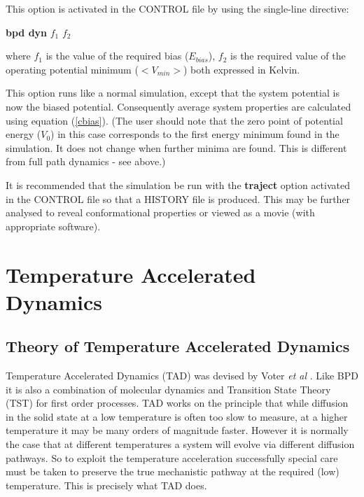 \noindent This option is activated in the CONTROL file by using the 
single-line directive:

{\bf bpd dyn} $f_1$ $f_2$

\noindent where $f_1$ is the value of the required bias ($E_{bias}$), 
$f_2$ is the required value of the operating potential minimum
($<V_{min}>$) both expressed in Kelvin.

This option runs like a normal \D{} simulation, except that the
system potential is now the biased potential. Consequently average
system properties are calculated using equation (\ref{cbias}). (The user
should note that the zero point of potential energy ($V_{0}$) in this case
corresponds to the first energy minimum found in the simulation. It does not
change when further minima are found. This is different from full path
dynamics - see above.)

It is recommended that the simulation be run with the {\bf traject}
option activated in the CONTROL file so that a HISTORY file is
produced. This may be further analysed to reveal conformational
properties or viewed as a movie (with appropriate software).

\section{Temperature Accelerated Dynamics}
\label{TAD}
\subsection{Theory of Temperature Accelerated Dynamics}

Temperature Accelerated Dynamics (TAD) was devised by Voter {\em et al}
\cite{voter-00a}. Like BPD it is also a combination of molecular
dynamics and Transition State Theory (TST) for first order processes.
TAD works on the principle that while diffusion in the solid state at
a low temperature is often too slow to measure, at a higher
temperature it may be many orders of magnitude faster. However it is
normally the case that at different temperatures a system will
evolve via different diffusion pathways. So to exploit the
temperature acceleration successfully special care must be taken to
preserve the true mechanistic pathway at the required (low)
temperature. This is precisely what TAD does.

